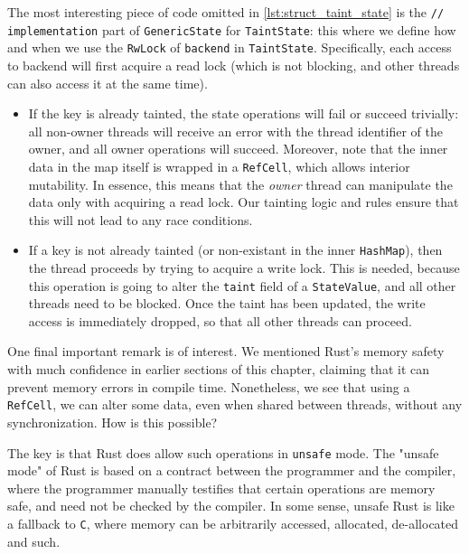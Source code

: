 The most interesting piece of code omitted in \ref{lst:struct_taint_state} is the \texttt{//
implementation} part of \texttt{GenericState} for \texttt{TaintState}: this where we define how and
when we use the \texttt{RwLock} of \texttt{backend} in \texttt{TaintState}. 
Specifically, each access to backend will first acquire a read lock (which is not blocking, 
and other threads can also access it at the same time).

\begin{itemize}
	\item If the key is already tainted, the state operations will fail or succeed trivially: all
	non-owner threads will receive an error with the thread identifier of the owner, and  all owner
	operations will succeed. Moreover, note that the inner data in the map itself is wrapped in a
	\texttt{RefCell}, which allows interior mutability\cite{RefCellInteriorMutability}. In essence,
	this means that the \textit{owner} thread can manipulate the data only with acquiring a read lock.
	Our tainting logic and rules ensure that this will not lead to any race conditions.
	\item If a key is not already tainted (or non-existant in the inner \texttt{HashMap}), then the
	thread proceeds by trying to acquire a write lock. This is needed, because this operation is
	going to alter the \texttt{taint} field of a \texttt{StateValue}, and all other threads need to
	be blocked. Once the taint has been updated, the write access is immediately dropped, so that
	all other threads can proceed.
\end{itemize}

One final important remark is of interest. We mentioned Rust's memory safety with much confidence in
earlier sections of this chapter, claiming that it can prevent memory errors in compile time.
Nonetheless, we see that using a \texttt{RefCell}, we can alter some data, even when shared between
threads, without any synchronization. How is this possible?

The key is that Rust does allow such operations in \texttt{unsafe} mode. The "unsafe mode" of Rust is
based on a contract between the programmer and the compiler, where the programmer manually
testifies that certain operations are memory safe, and need not be checked by the compiler. In
some sense, unsafe Rust is like a fallback to \texttt{C}, where memory can be arbitrarily accessed,
allocated, de-allocated and such.

